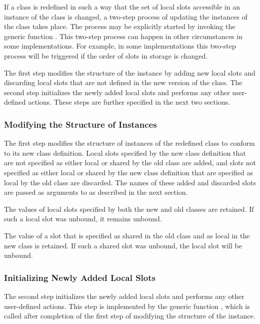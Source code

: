 If a class is redefined in such a way that the set of local slots
accessible in an instance of the class is changed, a two-step process
of updating the instances of the class takes place.  The process may
be explicitly started by invoking the generic function 
.  This two-step process can happen in other
circumstances in some implementations.  For example, in some
implementations this two-step process will be triggered if the order
of slots in storage is changed.

The first step modifies the structure of the instance by adding new
local slots and discarding local slots that are not defined in the new
version of the class.
The second step initializes the newly added local slots and performs
any other user-defined actions. These steps are further specified
in the next two sections.

\subsubsection{Modifying the Structure of Instances}

The first step modifies the structure of instances of the redefined
class to conform to its new class definition.  Local slots specified
by the new class definition that are not specified as either local or
shared by the old class are added, and slots not specified as either
local or shared by the new class definition that are specified as
local by the old class are discarded. The names of these added and discarded
slots are passed as arguments to 
as described in the next section.

The values of local slots specified by both the new and old classes
are retained. If such a local slot was unbound, it remains unbound.

The value of a slot that is specified as shared in the old class and
as local in the new class is retained.  If such a shared slot was
unbound, the local slot will be unbound.


\subsubsection{Initializing Newly Added Local Slots}

The second step initializes the newly added local slots and performs
any other user-defined actions.  This step is implemented by the generic
function , which is called after
completion of the first step of modifying the structure of the
instance.


